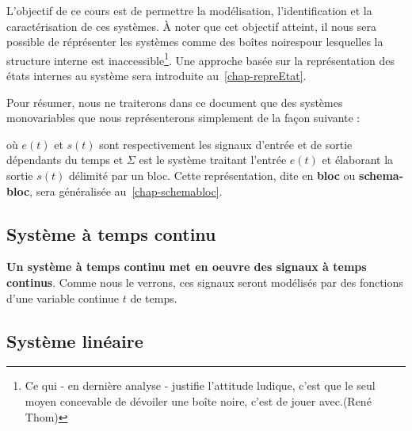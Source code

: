 L'objectif de ce cours est de permettre la modélisation, 
l'identification et la caractérisation de ces systèmes. 
\`A noter que cet objectif atteint, il nous sera possible de réprésenter 
les systèmes comme des \og boîtes noires\fg pour lesquelles la structure 
interne est inaccessible\footnote{\og Ce qui - en dernière analyse - justifie 
l'attitude ludique, c'est que le seul moyen concevable de dévoiler une 
boîte noire, c'est de jouer avec.\fg (René Thom)}. Une approche basée 
sur la représentation des états internes au système sera 
introduite au~\cref{chap-repreEtat}. 

Pour résumer, nous ne traiterons dans ce document 
que des systèmes monovariables que 
nous représenterons simplement de la façon suivante :
\begin{center}
\end{center}
où $e(t)$ et $s(t)$ sont respectivement les signaux d'entrée et de sortie 
dépendants du temps et $\Sigma$ est le système traitant l'entrée $e(t)$ et 
élaborant la sortie $s(t)$ délimité par un bloc. 
Cette représentation, dite en \textbf{bloc} ou 
\textbf{schema-bloc}, sera généralisée au~\cref{chap-schemabloc}.

\subsection{Système à temps continu}
\textbf{Un système à temps continu met en oeuvre des signaux 
à temps continus}. Comme nous le verrons, ces signaux seront
modélisés par des fonctions d'une variable continue $t$ de temps.

\subsection{Système linéaire}

